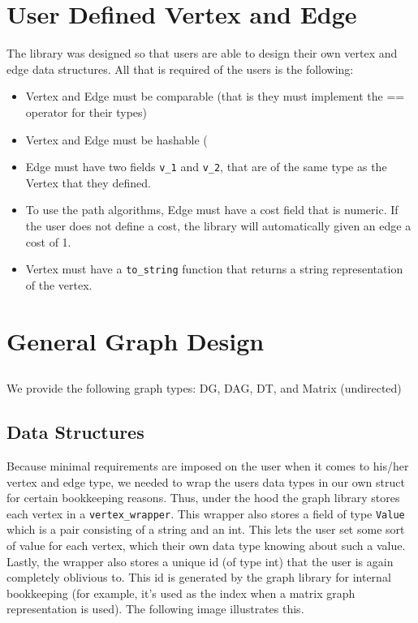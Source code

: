 \documentclass{article}
\begin{document}
\section{User Defined Vertex and Edge}
The library was designed so that users are able to design their own vertex and edge data structures. All that is required of the users is the following:
\begin{itemize}
\item Vertex and Edge must be comparable (that is they must implement the == operator for their types)
\item Vertex and Edge must be hashable (
\item Edge must have two fields \texttt{v\_1} and \texttt{v\_2}, that are of the same type as the Vertex that they defined.
\item To use the path algorithms, Edge must have a cost field that is numeric. If the user does not define a cost, the library will automatically given an edge a cost of 1.
\item Vertex must have a \texttt{to\_string} function that returns a string representation of the vertex. 
\end{itemize}

\section{General Graph Design}
\subsection{}
We provide the following graph types: DG, DAG, DT, and Matrix (undirected)

\subsection{Data Structures}
Because minimal requirements are imposed on the user when it comes to his/her vertex and edge type, we needed to wrap the users data types in our own struct for certain bookkeeping reasons. Thus, under the hood the graph library stores each vertex in a \texttt{vertex\_wrapper}. This wrapper also stores a field of type \texttt{Value} which is a pair consisting of a string and an int. This lets the user set some sort of value for each vertex, which their own data type knowing about such a value. Lastly, the wrapper also stores a unique id (of type int) that the user is again completely oblivious to. This id is generated by the graph library for internal bookkeeping (for example, it's used as the index when a matrix graph representation is used). The following image illustrates this.
\end{document}
